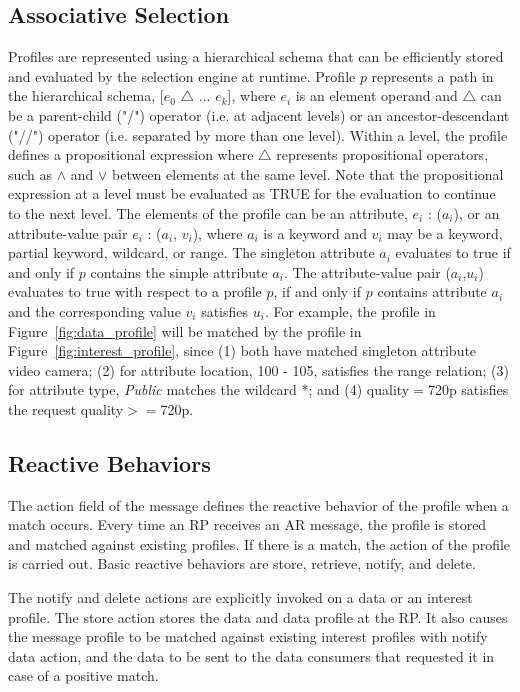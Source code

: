 \subsection{Associative Selection} 

Profiles are represented using a hierarchical schema that can be efficiently stored and evaluated by the selection engine at runtime. Profile $p$ represents a path in the hierarchical schema, [$e_0$ $\bigtriangleup$ ... $e_k$], where $e_i$ is an element operand and $\bigtriangleup$ can be a parent-child ("/") operator (i.e. at adjacent levels) or an ancestor-descendant ("//") operator (i.e. separated by more than one level). Within a level, the profile defines a propositional expression where $\bigtriangleup$ represents propositional operators, such as $\wedge$ and $\vee$ between elements at the same level. Note that the propositional expression at a level must be evaluated as TRUE for the evaluation to continue to the next level. The elements of the profile can be an attribute, $e_i$ : ($a_i$), or an attribute-value pair $e_i$ : ($a_i$, $v_i$), where $a_i$ is a keyword and $v_i$ may be a keyword, partial keyword, wildcard, or range. The singleton attribute $a_i$ evaluates to true if and only if $p$ contains the simple attribute $a_i$. The attribute-value pair ($a_i$,$u_i$) evaluates to true with respect to a profile $p$, if and only if $p$ contains attribute $a_i$ and the corresponding value $v_i$ satisfies $u_i$. For example, the profile in Figure~\ref{fig:data_profile} will be matched by the profile in Figure~\ref{fig:interest_profile}, since (1) both have matched singleton attribute video camera; (2) for attribute location, 100 - 105, satisfies the range relation; (3) for attribute type, {\it Public} matches the wildcard *; and (4) quality$=$720p satisfies the request quality$>=$720p. 

\subsection{Reactive Behaviors} 

The action field of the message defines the reactive behavior of the profile when a match occurs. Every time an RP receives an AR message, the profile is stored and matched against existing profiles. If there is a match, the action of the profile is carried out. Basic reactive behaviors are store, retrieve, notify, and delete.

The notify and delete actions are explicitly invoked on a data or an interest profile. The store action stores the data and data profile at the RP. It also causes the message profile to be matched against existing interest profiles with notify data action, and the data to be sent to the data consumers that requested it in case of a positive match.

